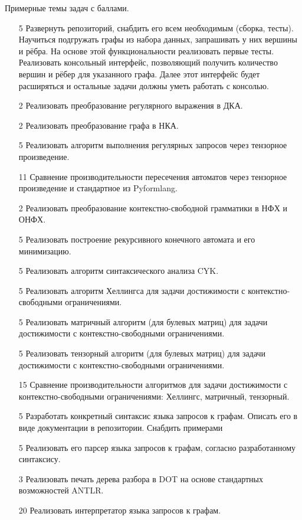 Примерные темы задач с баллами.
\begin{enumerate}
  \item [5] Развернуть репозиторий, снабдить его всем необходимым (сборка, тесты). Научиться подгружать графы из набора данных, запрашивать у них вершины и рёбра. На основе этой функциональности реализовать первые тесты. Реализовать консольный интерфейс, позволяющий получить количество вершин и рёбер для указанного графа. Далее этот интерфейс будет расширяться и остальные задачи должны уметь работать с консолью.
  \item [2] Реализовать преобразование регулярного выражения в ДКА.
  \item [2] Реализовать преобразование графа в НКА.
  \item [5] Реализовать алгоритм выполнения регулярных запросов через тензорное произведение.
  \item [11] Сравнение производительности пересечения автоматов через тензорное произведение и стандартное из Pyformlang.
  \item [2] Реализовать преобразование контекстно-свободной грамматики в НФХ и ОНФХ.
  \item [5] Реализовать построение рекурсивного конечного автомата и его минимизацию.
  \item [5] Реализовать алгоритм синтаксического анализа CYK.
  \item [5] Реализовать алгоритм Хеллингса для задачи достижимости с контекстно-свободными ограничениями.
  \item [5] Реализовать матричный алгоритм (для булевых матриц) для задачи достижимости с контекстно-свободными ограничениями.
  \item [5] Реализовать тензорный алгоритм (для булевых матриц) для задачи достижимости с контекстно-свободными ограничениями.
  \item [15] Сравнение производительности алгоритмов для задачи достижимости с контекстно-свободными ограничениями: Хеллингс, матричный, тензорный.
  \item [5] Разработать конкретный синтаксис языка запросов к графам. Описать его в виде документации в репозитории. Снабдить примерами
  \item [5] Реализовать его парсер языка запросов к графам, согласно разработанному синтаксису.
  \item [3] Реализовать печать дерева разбора в DOT на основе стандартных возможностей ANTLR.
  \item [20] Реализовать интерпретатор языка запросов к графам.
\end{enumerate}
